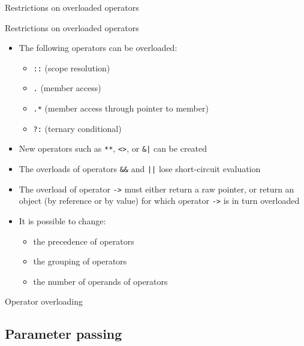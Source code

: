\begin{frame}{Restrictions on overloaded operators}{}
  \begin{block}{Restrictions on overloaded operators}
    \begin{itemize}
    \item
      The following operators can  be overloaded:
      \begin{itemize}
      \item
        \lstinline!::! (scope resolution)
      \item
        \lstinline!.! (member access)
      \item
        \lstinline!.*! (member access through pointer to member)
      \item
        \lstinline!?:! (ternary conditional)
      \end{itemize}
    \item
      New operators such as \lstinline!**!, \lstinline!<>!, or \lstinline!&|! can  be created
    \item
      The overloads of operators \lstinline!&&! and \lstinline!||! lose short-circuit evaluation
    \item
      The overload of operator \lstinline!->! must either return a raw pointer, or return an object (by reference or by value) for which operator \lstinline!->! is in turn overloaded
    \item
      It is  possible to change:
      \begin{itemize}
      \item
        the precedence of operators
      \item
        the grouping of operators
      \item
        the number of operands of operators
      \end{itemize}
    \end{itemize}
  \end{block}
\end{frame}

\begin{frame}{Operator overloading}{}
  \begin{example}
  \end{example}
\end{frame}


\subsection{Parameter passing}

